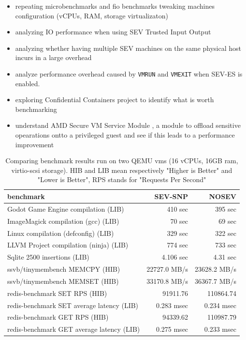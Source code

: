 \documentclass[twocolumn]{article}
\begin{document}
    \begin{itemize}
        \item repeating microbenchmarks and fio benchmarks tweaking machines configuration (vCPUs, RAM, storage virtualizaton)
        \item analyzing IO performance when using SEV Trusted Input Output \cite{tio}
        \item analyzing whether having multiple SEV machines on the same physical host incurs in a large overhead
        \item analyze performance overhead caused by \texttt{VMRUN} and \texttt{VMEXIT} when SEV-ES is enabled.
        \item exploring Confidential Containers \cite{coco} project to identify what is worth benchmarking
        \item understand AMD Secure VM Service Module \cite{svsm}, a module to offload sensitive opearations ontto a privileged guest and see if this leads to a performance improvement
    \end{itemize}
    \begin{table}
        \centering
        \label{tab:tinyben-results}
        \begin{tabular}{l|r|r}
        \textbf{benchmark}                        & \textbf{SEV-SNP} & \textbf{NOSEV} \\
        \hline
        Godot Game Engine compilation (LIB)       &  410 sec         & 395 sec        \\
        ImageMagick compilation (gcc) (LIB)       &  70 sec          & 69 sec         \\
        Linux compilation (defconfig) (LIB)       &  329 sec         & 322 sec        \\
        LLVM Project compilation (ninja) (LIB)    &  774 sec         & 733 sec        \\
        Sqlite 2500 insertions (LIB)              &  4.106 sec       & 4.31 sec       \\
        ssvb/tinymembench MEMCPY (HIB)            &  22727.0 MB/s    & 23628.2 MB/s   \\
        ssvb/tinymembench MEMSET (HIB)            &  33170.8 MB/s    & 36367.7 MB/s   \\
        redis-benchmark SET RPS (HIB)             &  91911.76        & 110864.74      \\
        redis-benchmark SET average latency (LIB) &  0.283 msec      & 0.234 msec     \\
        redis-benchmark GET RPS (HIB)             &  94339.62        & 110987.79      \\
        redis-benchmark GET average latency (LIB) &  0.275 msec	     & 0.233 msec     \\
        \end{tabular}
        \caption{Comparing benchmark results run on two QEMU vms (16 vCPUs, 16GB ram, virtio-scsi storage). HIB and LIB mean respectively "Higher is Better" and "Lower is Better", RPS stands for "Requests Per Second"} 
    \end{table}
\end{document}
